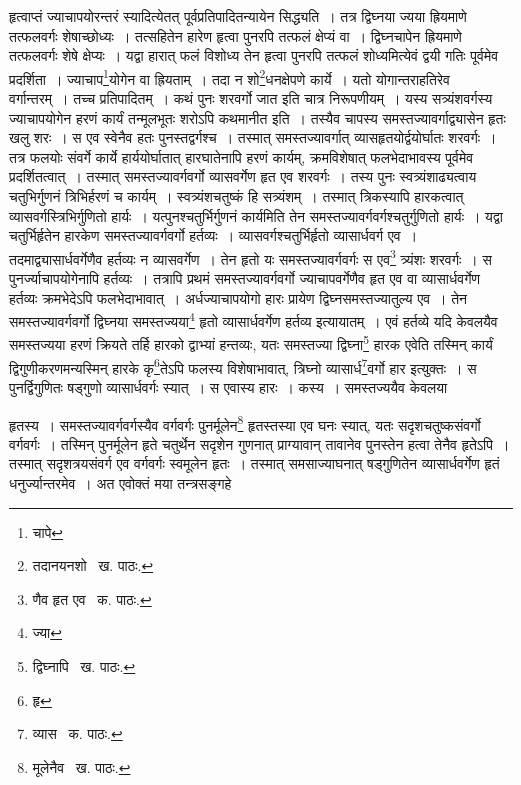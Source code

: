 \documentclass[11pt, openany]{book}
\begin{document}
\noindent हृत्वाप्तं ज्याचापयोरन्तरं स्यादित्येतत् पूर्वप्रतिपादितन्यायेन सिद्ध्यति~। तत्र द्विघ्नया ज्यया ह्रियमाणे तत्फलवर्गः शेषाच्छोध्यः~। तत्सहितेन हारेण हृत्वा पुनरपि तत्फलं क्षेप्यं वा~। द्विघ्नचापेन ह्रियमाणे तत्फलवर्गः शेषे क्षेप्यः~। यद्वा हारात् फलं विशोध्य तेन हृत्वा पुनरपि तत्फलं शोध्यमित्येवं द्वयी गतिः पूर्वमेव प्रदर्शिता~। ज्याचाप\renewcommand{\thefootnote}{१}\footnote{चापे}योगेन वा ह्रियताम्~। तदा न शो\renewcommand{\thefootnote}{२}\footnote{तदानयनशो \textendash\ ख. पाठः.}धनक्षेपणे कार्ये~। यतो योगान्तराहतिरेव वर्गान्तरम्~। तच्च प्रतिपादितम्~। कथं पुनः शरवर्गो जात इति चात्र निरूपणीयम्~। यस्य सत्र्यंशवर्गस्य ज्याचापयोगेन हरणं कार्यं तन्मूलभूतः शरोऽपि कथमानीत इति~। तस्यैव चापस्य समस्तज्यावर्गाद्व्यासेन हृतः खलु शरः~। स एव स्वेनैव हतः पुनस्तद्वर्गश्च~। तस्मात् समस्तज्यावर्गात् व्यासहृतयोर्द्वयोर्घातः शरवर्गः~। तत्र फलयोः संवर्गे कार्ये हार्ययोर्घातात् हारघातेनापि हरणं कार्यम्, क्रमविशेषात् फलभेदाभावस्य पूर्वमेव प्रदर्शितत्वात्~। तस्मात् समस्तज्यावर्गवर्गो व्यासवर्गेण हृत एव शरवर्गः~। तस्य पुनः स्वत्र्यंशाढ्यत्वाय चतुभिर्गुणनं त्रिभिर्हरणं च कार्यम्~। स्वत्र्यंशचतुष्कं हि सत्र्यंशम्~। तस्मात् त्रिकस्यापि हारकत्वात् व्यासवर्गस्त्रिभिर्गुणितो हार्यः~। यत्पुनश्चतुर्भिर्गुणनं कार्यमिति तेन समस्तज्यावर्गवर्गश्चतुर्गुणितो हार्यः~। यद्वा चतुर्भिर्हृतेन हारकेण समस्तज्यावर्गवर्गो हर्तव्यः~। व्यासवर्गश्चतुर्भिर्हृतो व्यासार्धवर्ग एव~।
तदमाद्व्यासार्धवर्गेणैव हर्तव्यः न व्यासवर्गेण~। तेन हृतो यः समस्तज्यावर्गवर्गः स एव\renewcommand{\thefootnote}{३}\footnote{णैव हृत एव \textendash\ क. पाठः.} त्र्यंशः शरवर्गः~। स पुनर्ज्याचापयोगेनापि हर्तव्यः~। तत्रापि प्रथमं समस्तज्यावर्गवर्गो ज्याचापवर्गेणैव हृत एव वा व्यासार्धवर्गेण हर्तव्यः क्रमभेदेऽपि फलभेदाभावात्~। अर्धज्याचापयोगो हारः प्रायेण द्विघ्नसमस्तज्यातुल्य एव~। तेन समस्तज्यावर्गवर्गो द्विघ्नया समस्तज्यया\renewcommand{\thefootnote}{४}\footnote{ज्या} हृतो व्यासार्धवर्गेण हर्तव्य इत्यायातम्~। एवं हर्तव्ये यदि केवलयैव समस्तज्यया हरणं क्रियते तर्हि हारको द्वाभ्यां हन्तव्यः, यतः समस्तज्या द्विघ्ना\renewcommand{\thefootnote}{५}\footnote{द्विघ्नापि \textendash\ ख. पाठः.} हारक एवेति तस्मिन् कार्यं द्विगुणीकरणमन्यस्मिन् हारके कृ\renewcommand{\thefootnote}{६}\footnote{हृ}तेऽपि फलस्य विशेषाभावात्, त्रिघ्नो व्यासार्ध\renewcommand{\thefootnote}{७}\footnote{व्यास \textendash\ क. पाठः.}वर्गो हार इत्युक्तः~। स पुनर्द्विगुणितः षड्गुणो व्यासार्धवर्गः स्यात्~। स एवास्य हारः~। कस्य~। समस्तज्ययैव केवलया

\newpage

\noindent हृतस्य~। समस्तज्यावर्गवर्गस्यैव वर्गवर्गः पुनर्मूलेन\renewcommand{\thefootnote}{१}\footnote{मूलेनैव \textendash\ ख. पाठः.} हृतस्तस्या एव घनः स्यात्, यतः सदृशचतुष्कसंवर्गो वर्गवर्गः~। तस्मिन् पुनर्मूलेन हृते चतुर्थेन सदृशेन गुणनात् प्राग्यावान् तावानेव पुनस्तेन हत्वा तेनैव हृतेऽपि~। तस्मात् सदृशत्रयसंवर्ग एव वर्गवर्गः स्वमूलेन हृतः~। तस्मात् समसाज्याघनात् षड्गुणितेन व्यासार्धवर्गेण हृतं धनुर्ज्यान्तरमेव~। अत एवोक्तं मया तन्त्रसङ्गहे\textendash 
\end{document}
